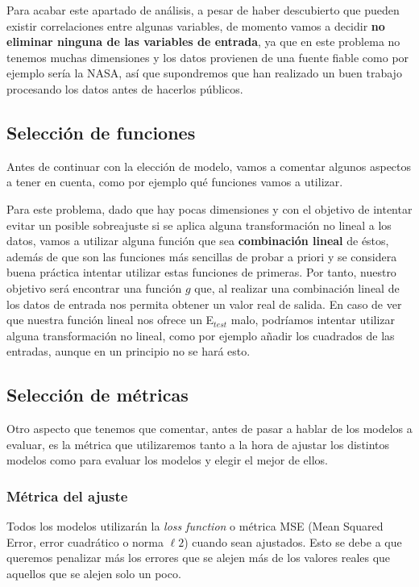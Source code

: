 \documentclass[11pt,a4paper]{article}
\begin{document}
Para acabar este apartado de análisis, a pesar de haber descubierto que
pueden existir correlaciones entre algunas variables, de momento vamos a
decidir \textbf{no eliminar ninguna de las variables de entrada}, ya que
en este problema no tenemos muchas dimensiones y los datos provienen de
una fuente fiable como por ejemplo sería la NASA, así que supondremos
que han realizado un buen trabajo procesando los datos antes de hacerlos
públicos.

    \subsection{Selección de funciones}\label{selecciuxf3n-de-funciones}

    Antes de continuar con la elección de modelo, vamos a comentar algunos
aspectos a tener en cuenta, como por ejemplo qué funciones vamos a
utilizar.

Para este problema, dado que hay pocas dimensiones y con el objetivo de
intentar evitar un posible sobreajuste si se aplica alguna
transformación no lineal a los datos, vamos a utilizar alguna función
que sea \textbf{combinación lineal} de éstos, además de que son las
funciones más sencillas de probar a priori y se considera buena práctica
intentar utilizar estas funciones de primeras. Por tanto, nuestro
objetivo será encontrar una función \(g\) que, al realizar una
combinación lineal de los datos de entrada nos permita obtener un valor
real de salida. En caso de ver que nuestra función lineal nos ofrece un
E\(_{test}\) malo, podríamos intentar utilizar alguna transformación no
lineal, como por ejemplo añadir los cuadrados de las entradas, aunque en
un principio no se hará esto.

    \subsection{Selección de métricas}\label{selecciuxf3n-de-muxe9tricas}

    Otro aspecto que tenemos que comentar, antes de pasar a hablar de los
modelos a evaluar, es la métrica que utilizaremos tanto a la hora de
ajustar los distintos modelos como para evaluar los modelos y elegir el
mejor de ellos.

\subsubsection{Métrica del ajuste}\label{muxe9trica-del-ajuste}

Todos los modelos utilizarán la \emph{loss function} o métrica MSE (Mean
Squared Error, error cuadrático o norma \(\ell 2\)) cuando sean
ajustados. Esto se debe a que queremos penalizar más los errores que se
alejen más de los valores reales que aquellos que se alejen solo un
poco.
\end{document}
